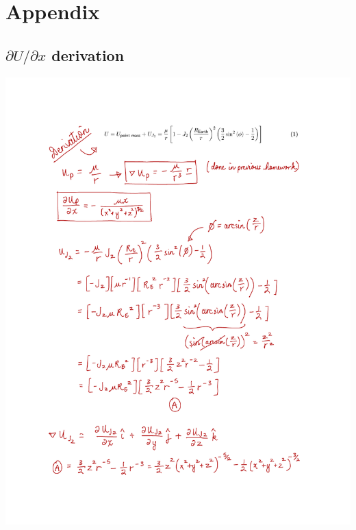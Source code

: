 \documentclass[conf]{new-aiaa}
\begin{document}

\newpage
\section*{Appendix} 

\subsection*{ $\partial U / \partial x$ derivation}

\includegraphics[page=1, width=\textwidth]{dUdx_derivation.pdf} \newpage
\end{document}
